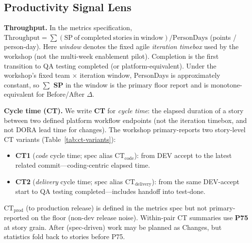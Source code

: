 \documentclass[10pt,conference]{IEEEtran}
\begin{document}
\subsection{Productivity Signal Lens}
\label{sec:scheme-productivity}

\textbf{Throughput.}
In the metrics specification, $\mathrm{Throughput}=\sum(\mathrm{SP\ of\ completed\ stories\ in\ window})/\mathrm{PersonDays}$ (points / person-day).
Here \emph{window} denotes the fixed agile \emph{iteration timebox} used by the workshop (not the multi-week enablement pilot).
Completion is the first transition to QA testing completed (or platform-equivalent).
Under the workshop's fixed team $\times$ iteration window, PersonDays is approximately constant, so \textbf{$\sum$ SP} in the window is the primary floor report and is monotone-equivalent for Before/After $\Delta$.

\textbf{Cycle time (CT).}
We write \textbf{CT} for \emph{cycle time}: the elapsed duration of a story between two defined platform workflow endpoints (not the iteration timebox, and not DORA lead time for changes).
The workshop primary-reports two story-level CT variants (Table~\ref{tab:ct-variants}):
\begin{itemize}
\item \textbf{CT1} (\emph{code} cycle time; spec alias $\mathrm{CT_{code}}$): from DEV accept to the latest related commit---coding-centric elapsed time.
\item \textbf{CT2} (\emph{delivery} cycle time; spec alias $\mathrm{CT_{delivery}}$): from the same DEV-accept start to QA testing completed---includes handoff into test-done.
\end{itemize}
$\mathrm{CT_{prod}}$ (to production release) is defined in the metrics spec but not primary-reported on the floor (non-dev release noise).
Within-pair CT summaries use \textbf{P75} at story grain.
After (spec-driven) work may be planned as Changes, but statistics fold back to stories before P75.
\end{document}
